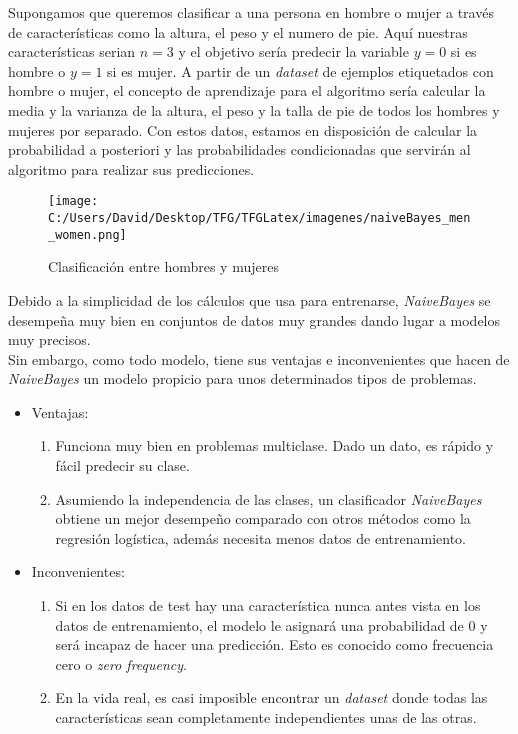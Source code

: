 Supongamos que queremos clasificar a una persona en hombre o mujer a través de características como 
la altura, el peso y el numero de pie. Aquí nuestras características serian $n=3$ y el objetivo 
sería predecir la variable $y=0$ si es hombre o $y=1$ si es mujer.
A partir de un \textit{dataset} de ejemplos etiquetados con hombre o mujer,
el concepto de aprendizaje para el algoritmo  sería calcular la media y la varianza 
de la altura, el peso y la talla de pie de todos los hombres y mujeres por separado.
Con estos datos, estamos en disposición de calcular la probabilidad a posteriori y las probabilidades 
condicionadas que servirán al algoritmo para realizar sus predicciones.

\begin{figure}[!htpb]
  \centering
  \texttt{[image: C:/Users/David/Desktop/TFG/TFGLatex/imagenes/naiveBayes\_men\_women.png]}
  \caption[Naive Bayes clasificación]{Clasificación entre hombres y mujeres}
  \label{men_women_boundary}
\end{figure}

Debido a la simplicidad de los cálculos que usa para entrenarse, \textit{NaiveBayes} se desempeña muy bien 
en conjuntos de datos muy grandes dando lugar a modelos muy precisos.\\
Sin embargo, como todo modelo, tiene sus ventajas e inconvenientes que hacen de \textit{NaiveBayes} un modelo 
propicio para unos determinados tipos de problemas.

\begin{itemize}
  \item Ventajas:
  \begin{enumerate}
    \item Funciona muy bien en problemas multiclase. Dado un dato, es rápido y fácil predecir su clase.
    \item Asumiendo la independencia de las clases, un clasificador \textit{NaiveBayes} obtiene un mejor 
    desempeño comparado con otros métodos como la regresión logística, además necesita menos datos 
    de entrenamiento.
  \end{enumerate}
  \item Inconvenientes:
  \begin{enumerate}
    \item Si en los datos de test hay una característica nunca antes vista en los datos de 
    entrenamiento, el modelo le asignará una probabilidad de 0 y será incapaz de hacer una predicción.
    Esto es conocido como frecuencia cero o \textit{zero frequency}.
    \item En la vida real, es casi imposible encontrar un \textit{dataset} donde todas las características 
    sean completamente independientes unas de las otras.
  \end{enumerate}
\end{itemize}

